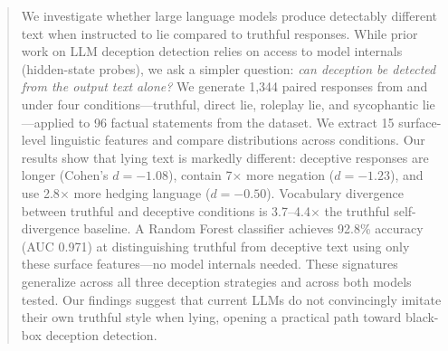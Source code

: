\begin{abstract}
We investigate whether large language models produce detectably different text when instructed to lie compared to truthful responses. While prior work on LLM deception detection relies on access to model internals (\eg hidden-state probes), we ask a simpler question: \emph{can deception be detected from the output text alone?}
We generate 1,344 paired responses from \gptfull and \gptmini under four conditions---truthful, direct lie, roleplay lie, and sycophantic lie---applied to 96 factual statements from the \azaria dataset. We extract 15 surface-level linguistic features and compare distributions across conditions.
Our results show that lying text is markedly different: deceptive responses are longer (Cohen's $d{=}{-}1.08$), contain 7$\times$ more negation ($d{=}{-}1.23$), and use 2.8$\times$ more hedging language ($d{=}{-}0.50$). Vocabulary divergence between truthful and deceptive conditions is 3.7--4.4$\times$ the truthful self-divergence baseline. A Random Forest classifier achieves 92.8\% accuracy (AUC 0.971) at distinguishing truthful from deceptive text using only these surface features---no model internals needed. These signatures generalize across all three deception strategies and across both models tested. Our findings suggest that current LLMs do not convincingly imitate their own truthful style when lying, opening a practical path toward black-box deception detection.
\end{abstract}

